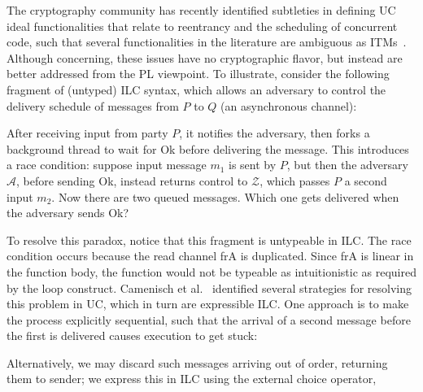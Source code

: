 The cryptography community has recently identified subtleties in defining UC ideal functionalities that relate to reentrancy and the scheduling of concurrent code, such that
several functionalities in the literature are ambiguous as ITMs~\cite{camenisch2016universal}.
Although concerning, these issues have no cryptographic flavor, but instead are better addressed from the PL viewpoint.
To illustrate, consider the following fragment of (untyped) ILC syntax, which allows an adversary to control the delivery schedule of messages from $P$ to $Q$ (an asynchronous channel):

After receiving input from party $P$, it
notifies the adversary, then forks a background thread to wait for \textsf{Ok} before
delivering the message.
This introduces a race condition: suppose input message $m_1$ is sent by $P$, but then the adversary $\mathcal A$, before sending \textsf{Ok}, instead returns control to $\mathcal Z$, which passes $P$ a second input $m_2$. Now there are two queued messages. Which one gets delivered when the adversary sends \textsf{Ok}?

To resolve this paradox, notice that this fragment is untypeable in ILC.
The race condition occurs because the read channel \textsf{frA} is duplicated.
Since \textsf{frA} is linear in the function body, the function would not be typeable as intuitionistic as required by the \textsf{loop} construct.
Camenisch et al.~\cite{camenisch2016universal} identified several strategies for resolving this problem in UC, which in turn are expressible ILC. One approach is to make the process explicitly sequential, such that the arrival of a second message before the first is delivered causes execution to get stuck:

Alternatively, we may discard such messages arriving out of order, returning them to sender; we express this in ILC using the external choice operator,

